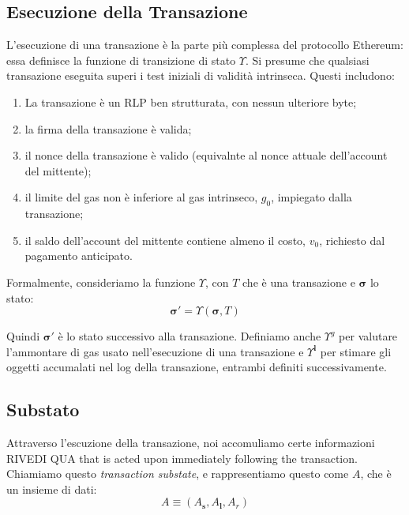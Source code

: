 \documentclass[9pt,oneside]{amsart}
\begin{document}
\begin{multicols}{2}

\section{Esecuzione della Transazione} \label{ch:transactions}

L'esecuzione di una transazione è la parte più complessa del protocollo Ethereum: essa definisce la funzione di transizione di stato $\Upsilon$. Si presume che qualsiasi transazione eseguita superi i test iniziali di validità intrinseca. Questi includono:

\begin{enumerate}
\item La transazione è un RLP ben strutturata, con nessun ulteriore byte;
\item la firma della transazione è valida;
\item il nonce della transazione è valido (equivalnte al nonce attuale dell'account del mittente);
\item il limite del gas non è inferiore al gas intrinseco, $g_0$, impiegato dalla transazione;
\item il saldo dell'account del mittente contiene almeno il costo, $v_0$, richiesto dal pagamento anticipato.
\end{enumerate}

Formalmente, consideriamo la funzione $\Upsilon$, con $T$ che è una transazione e $\boldsymbol{\sigma}$ lo stato:
\begin{equation}
\boldsymbol{\sigma}' = \Upsilon(\boldsymbol{\sigma}, T)
\end{equation}

Quindi $\boldsymbol{\sigma}'$ è lo stato successivo alla transazione. Definiamo anche $\Upsilon^g$ per valutare l'ammontare di gas usato nell'esecuzione di una transazione e $\Upsilon^\mathbf{l}$ per stimare gli oggetti accumalati nel log della transazione, entrambi definiti successivamente.

\subsection{Substato}
Attraverso l'escuzione della transazione, noi accomuliamo certe informazioni RIVEDI QUA that is acted upon immediately following the transaction. Chiamiamo questo \textit{transaction substate}, e rappresentiamo questo come $A$, che è un insieme di dati:
\begin{equation}
A \equiv (A_\mathbf{s}, A_\mathbf{l}, A_r)
\end{equation}


\end{multicols}
\end{document}
